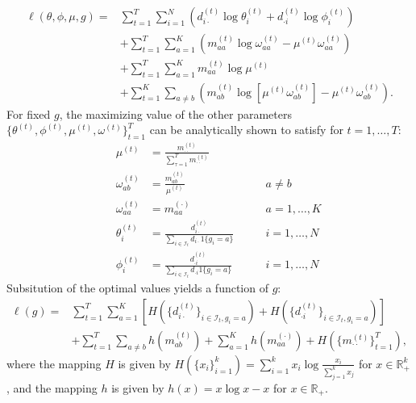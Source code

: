 \documentclass{article}
\begin{document}
\begin{align*}
\ell(\theta,\phi,\mu,g) =& \sum_{t=1}^T \sum_{i=1}^N \left( d_{i\cdot}^{(t)} \log \theta_i^{(t)} + d_{\cdot i}^{(t)} \log \phi_i^{(t)} \right) \\
& + \sum_{t=1}^T \sum_{a=1}^K \left(m_{aa}^{(t)} \log \omega_{aa}^{(t)} - \mu^{(t)}\omega_{aa}^{(t)}\right) \\
& + \sum_{t=1}^T \sum_{a=1}^K m_{aa}^{(t)}\log \mu^{(t)} \\
& + \sum_{t=1}^K \sum_{a \neq b} \left( m_{ab}^{(t)} \log \left[\mu^{(t)}\omega_{ab}^{(t)}\right] -\mu^{(t)}\omega_{ab}^{(t)}\right).
\end{align*}
For fixed $g$, the maximizing value of the other parameters $\{ \theta^{(t)}, \phi^{(t)}, \mu^{(t)}, \omega^{(t)}\}_{t=1}^T$ can be analytically shown to satisfy for $t=1,\ldots,T$:
\begin{align*}
& &\mu^{(t)} &= \frac{m_{\cdot\cdot}^{(t)}}{\sum_{\tau=1}^T m_{\cdot\cdot}^{(t)}} & \\
& & \omega_{ab}^{(t)} & = \frac{m_{ab}^{(t)}}{\mu^{(t)}} & \qquad a\neq b \\
& & \omega_{aa}^{(t)} &= m_{aa}^{(\cdot)} & \qquad a=1,\ldots,K \\
& & \theta_i^{(t)} &= \frac{ d_{i\cdot}^{(t)} }{ \sum_{i\in \mathcal{I}_t} d_{i\cdot} 1\{g_i = a\} } & \qquad i=1,\ldots,N \\
& & \phi_i^{(t)} &= \frac{ d_{\cdot i}^{(t)}}{\sum_{i \in \mathcal{I}_t} d_{\cdot i} 1\{g_i=a\} } & \qquad i=1,\ldots,N
\end{align*}
Subsitution of the optimal values yields a function of $g$:
\begin{align} 
\nonumber \ell(g) =& \sum_{t=1}^T \sum_{a=1}^K \left[ H\left(\{d_{i\cdot}^{(t)}\}_{i \in \mathcal{I}_t, g_i=a}\right) + H\left(\{d_{\cdot i}^{(t)}\}_{i \in \mathcal{I}_t, g_i=a}\right) \right] \\
& + \sum_{t=1}^T \sum_{a\neq b} h(m_{ab}^{(t)}) + \sum_{a=1}^K h( m_{aa}^{(\cdot )}) + H\left(\{m_{\cdot \cdot}^{(t)}\}_{t=1}^T\right), \label{eq:model}
\end{align}
where the mapping $H$ is given by $H(\{x_i\}_{i=1}^k) = \sum_{i=1}^k x_i \log \frac{x_i}{\sum_{j=1}^k x_j}$ for $x \in \mathbb{R}_+^k$, and the mapping $h$ is given by $h(x) = x \log x - x$ for $x \in \mathbb{R}_+$.
\end{document}

